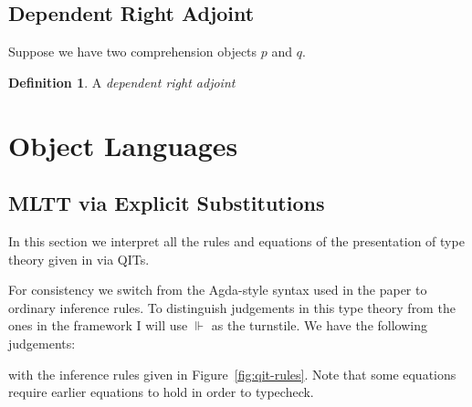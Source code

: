 \documentclass[10pt]{article}
\theoremstyle{definition}
\newtheorem{definition}{Definition}
\newcommand{\CTX}{\,\,\mathsf{Ctx}}
\newcommand{\TYPE}{\,\,\mathsf{Type}}
\begin{document}
\subsection{Dependent Right Adjoint}

Suppose we have two comprehension objects $p$ and $q$.

\begin{definition}
A \emph{dependent right adjoint}
\end{definition}

\section{Object Languages}

\subsection{MLTT via Explicit Substitutions}
\newcommand{\qyields}{\Vdash} \newcommand{\varsof}[1]{{#1}^\dagger}
\newcommand{\upstairs}[1]{\overline{#1}}
\newcommand{\downstairs}[1]{\underline{#1}}
\newcommand{\asdep}[1]{{#1}_p}
\newcommand\proj[1]{\ensuremath{\mathsf{proj}_{#1}}}
\newcommand\qvar[1]{\ensuremath{\mathsf{var}_{#1}}}
\newcommand\outof[1]{\ensuremath{\mathsf{outof}_{#1}}}
\newcommand\into[1]{\ensuremath{\mathsf{into}_{#1}}}

In this section we interpret all the rules and equations of the presentation of type theory given in \cite{altenkirchkaposi16qit} via QITs. 

For consistency we switch from the Agda-style syntax used in the paper to ordinary inference rules. To distinguish judgements in this type theory from the ones in the framework I will use $\qyields$ as the turnstile.  We have the following judgements:
with the inference rules given in Figure~\ref{fig:qit-rules}. Note that some equations require earlier equations to hold in order to typecheck.
\end{document}
